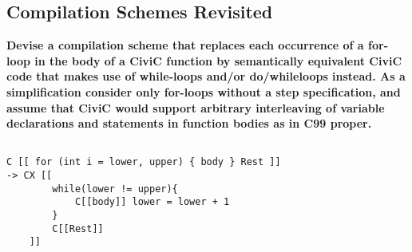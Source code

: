 \documentclass[hidelinks]{uva-inf-article}
\begin{document}
\begin{flushleft}
\newpage
\section{Compilation Schemes Revisited}
\textbf{Devise a compilation scheme that replaces each occurrence of a for-loop in the body of a CiviC
function by semantically equivalent CiviC code that makes use of while-loops and/or do/whileloops instead. As a simplification consider only for-loops without a step specification, and assume
that CiviC would support arbitrary interleaving of variable declarations and statements in function
bodies as in C99 proper.}

\begin{lstlisting}[caption=Compilation Scheme, captionpos=b]

C [[ for (int i = lower, upper) { body } Rest ]]
-> CX [[
        while(lower != upper){ 
            C[[body]] lower = lower + 1 
        } 
        C[[Rest]] 
    ]]
\end{lstlisting}
\end{flushleft}
\end{document}
